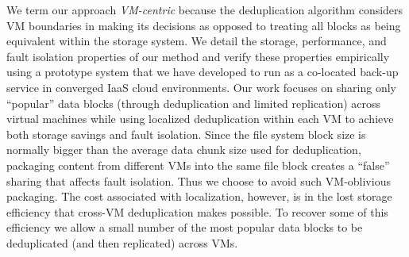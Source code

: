 We term our approach {\em VM-centric} because the deduplication
algorithm considers VM boundaries in making its decisions as opposed to
treating all blocks as being equivalent within the storage system.
We detail the storage, performance,
and fault isolation properties
of our method and verify these properties empirically using a prototype
system that we have developed to run as a co-located back-up service in
converged IaaS cloud environments.
Our work focuses on sharing only ``popular'' data blocks 
(through deduplication and limited replication)
across 
virtual machines while using localized deduplication within each VM
to achieve both storage savings and fault isolation.
Since
the file system block size is normally bigger than the average data chunk size
used for deduplication,  packaging
content from different VMs into the same file block  creates a ``false'' sharing that 
affects fault isolation. Thus we choose to avoid such VM-oblivious packaging.
The cost associated with localization, however, is in 
the lost
storage efficiency that cross-VM deduplication makes possible.  To recover
some of this efficiency we allow a small number of the most popular data
blocks to be deduplicated (and then replicated) across VMs.  



